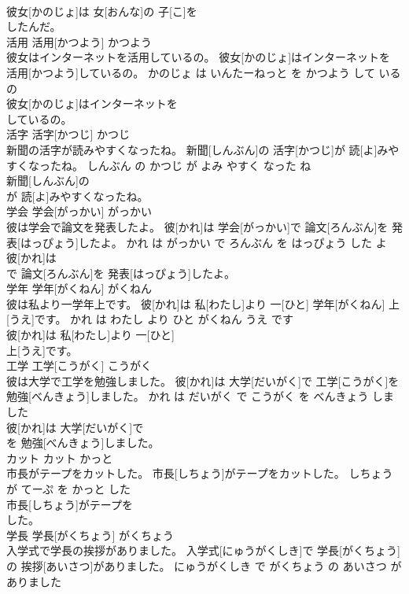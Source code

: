 \documentclass[8pt]{extreport}
\begin{document}
\begin{CJK}{UTF8}{min}
\\	彼女[かのじょ]は 女[おんな]の 子[こ]を
\\	したんだ。			
\\	活用	活用[かつよう]	かつよう	
\\	彼女はインターネットを活用しているの。	彼女[かのじょ]はインターネットを 活用[かつよう]しているの。	かのじょ は いんたーねっと を かつよう して いる の	
\\	彼女[かのじょ]はインターネットを
\\	しているの。			
\\	活字	活字[かつじ]	かつじ	
\\	新聞の活字が読みやすくなったね。	新聞[しんぶん]の 活字[かつじ]が 読[よ]みやすくなったね。	しんぶん の かつじ が よみ やすく なった ね	
\\	新聞[しんぶん]の
\\	が 読[よ]みやすくなったね。			
\\	学会	学会[がっかい]	がっかい	
\\	彼は学会で論文を発表したよ。	彼[かれ]は 学会[がっかい]で 論文[ろんぶん]を 発表[はっぴょう]したよ。	かれ は がっかい で ろんぶん を はっぴょう した よ	
\\	彼[かれ]は
\\	で 論文[ろんぶん]を 発表[はっぴょう]したよ。			
\\	学年	学年[がくねん]	がくねん	
\\	彼は私より一学年上です。	彼[かれ]は 私[わたし]より 一[ひと] 学年[がくねん] 上[うえ]です。	かれ は わたし より ひと がくねん うえ です	
\\	彼[かれ]は 私[わたし]より 一[ひと]
\\	上[うえ]です。			
\\	工学	工学[こうがく]	こうがく	
\\	彼は大学で工学を勉強しました。	彼[かれ]は 大学[だいがく]で 工学[こうがく]を 勉強[べんきょう]しました。	かれ は だいがく で こうがく を べんきょう しました	
\\	彼[かれ]は 大学[だいがく]で
\\	を 勉強[べんきょう]しました。			
\\	カット	カット	かっと	
\\	市長がテープをカットした。	市長[しちょう]がテープをカットした。	しちょう が てーぷ を かっと した	
\\	市長[しちょう]がテープを
\\	した。			
\\	学長	学長[がくちょう]	がくちょう	
\\	入学式で学長の挨拶がありました。	入学式[にゅうがくしき]で 学長[がくちょう]の 挨拶[あいさつ]がありました。	にゅうがくしき で がくちょう の あいさつ が ありました	

\end{CJK}
\end{document}
